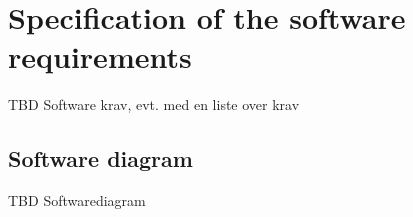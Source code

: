 
\section{Specification of the software requirements}
TBD Software krav, evt. med en liste over krav

\subsection{Software diagram}
TBD Softwarediagram